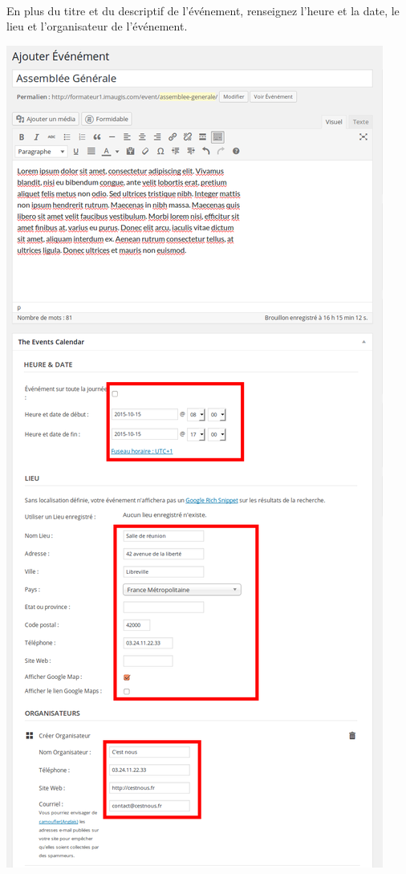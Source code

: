 \documentclass[10pt,a4paper]{article}
\begin{document}
\paragraph{}En plus du titre et du descriptif de l'événement, renseignez l'heure et la date, le lieu et l'organisateur de l'événement.
\begin{center}
\includegraphics[scale=0.3]{img/0198.png}
\end{center}
\end{document}
